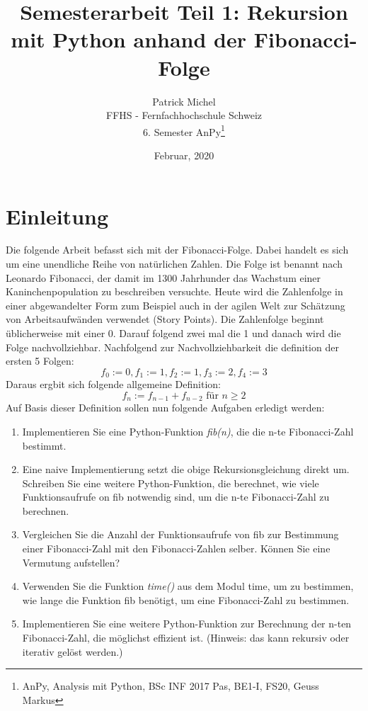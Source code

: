 \documentclass[12pt]{article}
\title{Semesterarbeit Teil 1: Rekursion mit Python anhand der Fibonacci-Folge}
\date{Februar, 2020}
\author{Patrick Michel\\
FFHS - Fernfachhochschule Schweiz\\
6. Semester AnPy\thanks{AnPy, Analysis mit Python, BSc INF 2017 Pas, BE1-I, FS20, Geuss Markus}
}
\begin{document}
\begin{titlepage}

\maketitle
\tableofcontents

\end{titlepage}


\section{Einleitung}
Die folgende Arbeit befasst sich mit der Fibonacci-Folge. 
Dabei handelt es sich um eine unendliche Reihe von natürlichen Zahlen.
Die Folge ist benannt nach Leonardo Fibonacci, 
der damit im 1300 Jahrhunder das Wachstum einer Kaninchenpopulation zu beschreiben versuchte.
Heute wird die Zahlenfolge in einer abgewandelter Form zum Beispiel auch
in der agilen Welt zur Schätzung von Arbeitsaufwänden verwendet (Story Points).
Die Zahlenfolge beginnt üblicherweise mit einer 0.
Darauf folgend zwei mal die 1 und danach wird die Folge nachvollziehbar.
Nachfolgend zur Nachvollziehbarkeit die definition der ersten 5 Folgen:
\begin{equation}
  f_0 := 0,
  f_1 := 1,
  f_2 := 1,
  f_3 := 2,
  f_4 := 3
\end{equation}
Daraus ergbit sich folgende allgemeine Definition:
\begin{equation}
  f_n := f_{n-1} + f_{n-2} \text{ für } n \ge 2
\end{equation}
Auf Basis dieser Definition sollen nun folgende Aufgaben
erledigt werden:
\begin{enumerate}
  \item Implementieren Sie eine Python-Funktion \textit{fib(n)}, die die n-te Fibonacci-Zahl bestimmt.
  \item Eine naive Implementierung setzt die obige Rekursionsgleichung direkt um. Schreiben Sie eine weitere Python-Funktion, die berechnet, wie viele Funktionsaufrufe on fib notwendig sind, um die n-te Fibonacci-Zahl zu berechnen.
  \item Vergleichen Sie die Anzahl der Funktionsaufrufe von fib zur Bestimmung einer Fibonacci-Zahl mit den Fibonacci-Zahlen selber. Können Sie eine Vermutung aufstellen?
  \item Verwenden Sie die Funktion \textit{time()} aus dem Modul time, um zu bestimmen, wie lange die Funktion fib benötigt, um eine Fibonacci-Zahl zu bestimmen.
  \item Implementieren Sie eine weitere Python-Funktion zur Berechnung der n-ten Fibonacci-Zahl, die möglichst effizient ist. (Hinweis: das kann rekursiv oder iterativ gelöst werden.)
\end{enumerate}
\end{document}
